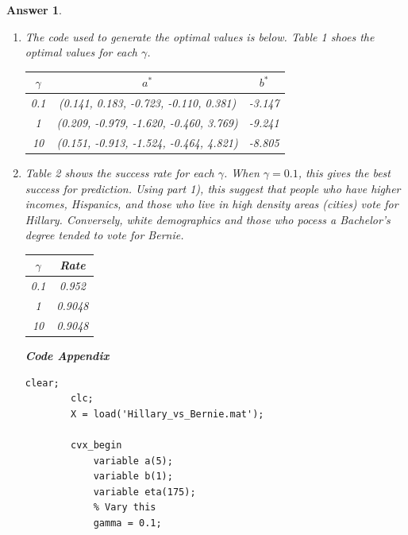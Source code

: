 \documentclass[12pt]{article}
\theoremstyle{colon}
\newtheorem*{answer}{Answer}
\begin{document}
\begin{answer}
  \leavevmode
  \begin{enumerate}[label=\arabic*)]
    \item The code used to generate the optimal values is below. Table 1 shoes the optimal values for each $\gamma$.
      \begin{center}
        \begin{tabular}{|c|c|c|}
          \hline
          $ \gamma $ & $a^*$ & $b^*$ \\
          \hline
          0.1 & (0.141, 0.183, -0.723, -0.110, 0.381) & -3.147 \\
          \hline
          1 & (0.209, -0.979, -1.620, -0.460, 3.769) & -9.241 \\
          \hline
          10 & (0.151, -0.913, -1.524, -0.464, 4.821) & -8.805 \\
          \hline
        \end{tabular}
      \end{center}

    \item Table 2 shows the success rate for each $\gamma$. When $\gamma = 0.1$, this gives the best success for prediction. Using part 1), this suggest that people who have higher incomes, Hispanics, and those who live in high density areas (cities) vote for Hillary. Conversely, white demographics and those who pocess a Bachelor's degree tended to vote for Bernie.

      \begin{center}
        \begin{tabular}{|c|c|}
          \hline
          $ \gamma $ & Rate \\
          \hline
          0.1 & 0.952 \\
          \hline
          1 & 0.9048 \\
          \hline
          10 & 0.9048 \\
          \hline
        \end{tabular}
      \end{center}

      \textbf{Code Appendix}

      \begin{lstlisting}[style=Matlab-editor, basicstyle=\scriptsize]
        clear;
        clc;
        X = load('Hillary_vs_Bernie.mat');

        cvx_begin
            variable a(5);
            variable b(1);
            variable eta(175);
            % Vary this
            gamma = 0.1;


\end{lstlisting}
\end{enumerate}
\end{answer}
\end{document}
